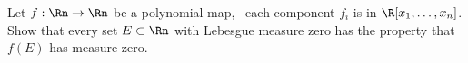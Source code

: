 Let $f:\Rn\rightarrow \Rn$ be a polynomial map, \ie\ each component
$f_i$ is in $\R[x_1,\ldots,x_n]$. Show that every set $E\subset \Rn$
with Lebesgue measure zero has the property that $f(E)$ has measure
zero.
